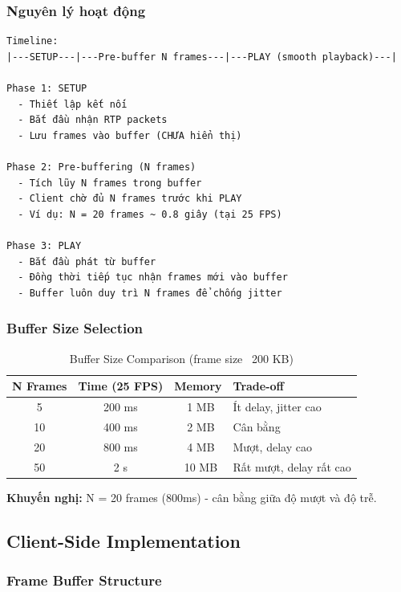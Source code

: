 \documentclass[a4paper,12pt]{article}
\begin{document}
\subsubsection{Nguyên lý hoạt động}

\begin{verbatim}
Timeline:
|---SETUP---|---Pre-buffer N frames---|---PLAY (smooth playback)---|

Phase 1: SETUP
  - Thiết lập kết nối
  - Bắt đầu nhận RTP packets
  - Lưu frames vào buffer (CHƯA hiển thị)

Phase 2: Pre-buffering (N frames)
  - Tích lũy N frames trong buffer
  - Client chờ đủ N frames trước khi PLAY
  - Ví dụ: N = 20 frames ~ 0.8 giây (tại 25 FPS)

Phase 3: PLAY
  - Bắt đầu phát từ buffer
  - Đồng thời tiếp tục nhận frames mới vào buffer
  - Buffer luôn duy trì N frames để chống jitter
\end{verbatim}

\subsubsection{Buffer Size Selection}

\begin{table}[H]
\centering
\begin{tabular}{|c|c|c|l|}
\hline
\textbf{N Frames} & \textbf{Time (25 FPS)} & \textbf{Memory} & \textbf{Trade-off} \\
\hline
5 & 200 ms & ~1 MB & Ít delay, jitter cao \\
10 & 400 ms & ~2 MB & Cân bằng \\
20 & 800 ms & ~4 MB & Mượt, delay cao \\
50 & 2 s & ~10 MB & Rất mượt, delay rất cao \\
\hline
\end{tabular}
\caption{Buffer Size Comparison (frame size ~200 KB)}
\end{table}

\textbf{Khuyến nghị:} N = 20 frames (800ms) - cân bằng giữa độ mượt và độ trễ.

\subsection{Client-Side Implementation}

\subsubsection{Frame Buffer Structure}
\end{document}
